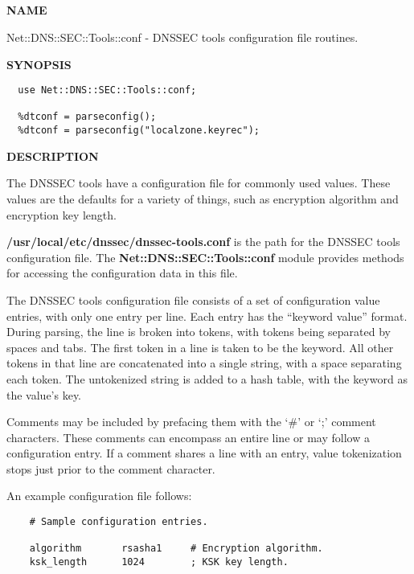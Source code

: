 \clearpage

\subsection{}


{\bf NAME}

Net::DNS::SEC::Tools::conf - DNSSEC tools configuration file routines.

{\bf SYNOPSIS}

\begin{verbatim}
  use Net::DNS::SEC::Tools::conf;

  %dtconf = parseconfig();
  %dtconf = parseconfig("localzone.keyrec");
\end{verbatim}

{\bf DESCRIPTION}

The DNSSEC tools have a configuration file for commonly used values.
These values are the defaults for a variety of things, such as
encryption algorithm and encryption key length.

{\bf /usr/local/etc/dnssec/dnssec-tools.conf} is the path for the DNSSEC tools
configuration file.  The {\bf Net::DNS::SEC::Tools::conf} module provides
methods for accessing the configuration data in this file.

The DNSSEC tools configuration file consists of a set of configuration
value entries, with only one entry per line.  Each entry has the
``keyword value'' format.  During parsing, the line is broken into
tokens, with tokens being separated by spaces and tabs.  The first
token in a line is taken to be the keyword.  All other tokens in that
line are concatenated into a single string, with a space separating
each token.  The untokenized string is added to a hash table, with the
keyword as the value's key.

Comments may be included by prefacing them with the `\#' or `;'
comment characters.  These comments can encompass an entire line or may
follow a configuration entry.  If a comment shares a line with an entry,
value tokenization stops just prior to the comment character.

An example configuration file follows:

\begin{verbatim}
    # Sample configuration entries.

    algorithm       rsasha1     # Encryption algorithm.
    ksk_length      1024        ; KSK key length.
\end{verbatim}

